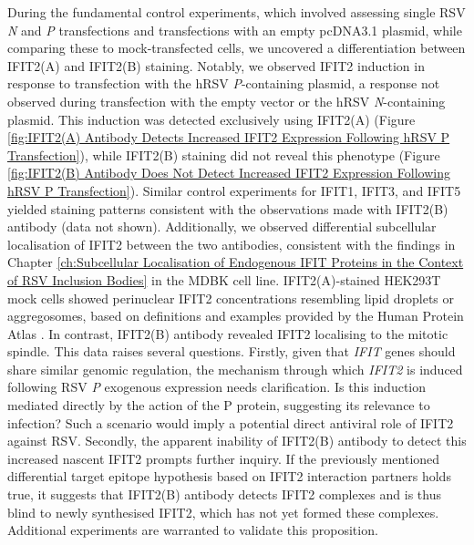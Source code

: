 During the fundamental control experiments, which involved assessing single RSV \textit{N} and \textit{P} transfections and transfections with an empty pcDNA3.1 plasmid, while comparing these to mock-transfected cells, we uncovered a differentiation between IFIT2(A) and IFIT2(B) staining. Notably, we observed IFIT2 induction in response to transfection with the hRSV \textit{P}-containing plasmid, a response not observed during transfection with the empty vector or the hRSV \textit{N}-containing plasmid. This induction was detected exclusively using IFIT2(A) (Figure \ref{fig:IFIT2(A) Antibody Detects Increased IFIT2 Expression Following hRSV P Transfection}), while IFIT2(B) staining did not reveal this phenotype (Figure \ref{fig:IFIT2(B) Antibody Does Not Detect Increased IFIT2 Expression Following hRSV P Transfection}). Similar control experiments for IFIT1, IFIT3, and IFIT5 yielded staining patterns consistent with the observations made with IFIT2(B) antibody (data not shown). Additionally, we observed differential subcellular localisation of IFIT2 between the two antibodies, consistent with the findings in Chapter \ref{ch:Subcellular Localisation of Endogenous IFIT Proteins in the Context of RSV Inclusion Bodies} in the MDBK cell line. IFIT2(A)-stained HEK293T mock cells showed perinuclear IFIT2 concentrations resembling lipid droplets or aggregosomes, based on definitions and examples provided by the Human Protein Atlas \cite{Thul2017AProteome}. In contrast, IFIT2(B) antibody revealed IFIT2 localising to the mitotic spindle. This data raises several questions. Firstly, given that \textit{IFIT} genes should share similar genomic regulation, the mechanism through which \textit{IFIT2} is induced following RSV \textit{P} exogenous expression needs clarification. Is this induction mediated directly by the action of the P protein, suggesting its relevance to infection? Such a scenario would imply a potential direct antiviral role of IFIT2 against RSV. Secondly, the apparent inability of IFIT2(B) antibody to detect this increased nascent IFIT2 prompts further inquiry. If the previously mentioned differential target epitope hypothesis based on IFIT2 interaction partners holds true, it suggests that IFIT2(B) antibody detects IFIT2 complexes and is thus blind to newly synthesised IFIT2, which has not yet formed these complexes. Additional experiments are warranted to validate this proposition.

